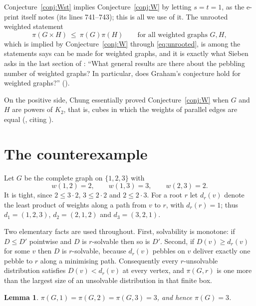 \documentclass[11pt]{amsart}
\newtheorem{lemma}[theorem]{Lemma}
\theoremstyle{definition}
\begin{document}
Conjecture~\ref{conj:Wst} implies Conjecture~\ref{conj:W} by letting
$s=t=1$, as the e-print itself notes (its lines 741--743); this is all we use
of it. The unrooted weighted statement
\begin{equation}\label{eq:WG}
  \pi(G\times H)\ \le\ \pi(G)\pi(H)
  \qquad\text{for all weighted graphs }G,H,
\end{equation}
which is implied by Conjecture~\ref{conj:W} through \eqref{eq:unrooted}, is
among the statements \cite{HHH} says can be made for weighted graphs, and it
is exactly what Sieben asks in the last section of \cite{Sieben}: ``What
general results are there about the pebbling number of weighted graphs? In
particular, does Graham's conjecture hold for weighted graphs?''
(\cite[e-print source, lines 1016--1021]{Sieben}).

On the positive side, Chung essentially proved
Conjecture~\ref{conj:W} when $G$ and $H$ are powers of $K_2$, that is,
cubes in which the weights of parallel edges are equal
(\cite[lines 696--699]{HHH}, citing \cite[Theorem~3]{Chung}).

\section{The counterexample}

Let $G$ be the complete graph on $\{1,2,3\}$ with
\[
  w(1,2)=2,\qquad w(1,3)=3,\qquad w(2,3)=2 .
\]
It is tight, since $2\le3\cdot2$, $3\le2\cdot2$ and $2\le2\cdot3$. For a root
$r$ let $d_r(v)$ denote the least product of weights along a path from $v$ to
$r$, with $d_r(r)=1$; thus $d_1=(1,2,3)$, $d_2=(2,1,2)$ and $d_3=(3,2,1)$.

Two elementary facts are used throughout. First, solvability is monotone:
if $D\le D'$ pointwise and $D$ is $r$-solvable then so is $D'$. Second, if
$D(v)\ge d_r(v)$ for some $v$ then $D$ is $r$-solvable, because $d_r(v)$
pebbles on $v$ deliver exactly one pebble to $r$ along a minimising path.
Consequently every $r$-unsolvable distribution satisfies $D(v)<d_r(v)$ at
every vertex, and $\pi(G,r)$ is one more than the largest size of an
unsolvable distribution in that finite box.

\begin{lemma}\label{lem:factor}
$\pi(G,1)=\pi(G,2)=\pi(G,3)=3$, and hence $\pi(G)=3$.
\end{lemma}
\end{document}
